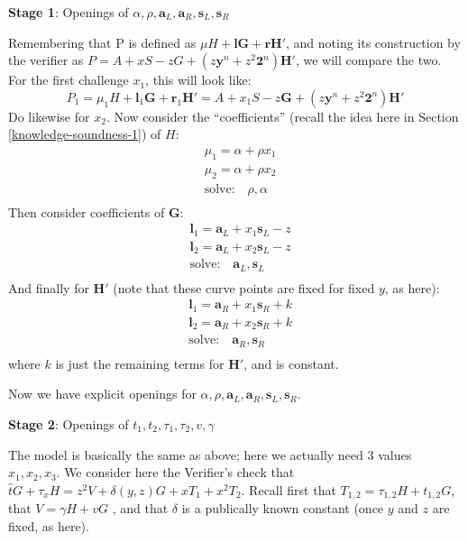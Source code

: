 \documentclass[10pt,a4paper]{article}
\begin{document}
\textbf{Stage 1}: Openings of $\alpha, \rho, \textbf{a}_L, \textbf{a}_R, \textbf{s}_L, \textbf{s}_R$

Remembering that P is defined as $\mu H + \textbf{lG} + \textbf{rH}'$, and noting its construction by the
verifier as $P = A + xS -zG + \left(z\textbf{y}^n + z^2\textbf{2}^n\right)\textbf{H}'$, we will compare the two. For the first challenge $x_1$, this
will look like:
\[P_1 = \mu_1 H + \textbf{l}_1\textbf{G} + \textbf{r}_1\textbf{H}' = A + x_1S -z\textbf{G} + (z\textbf{y}^n+z^2\textbf{2}^n)\textbf{H}'\]
Do likewise for $x_2$. Now consider the ``coefficients'' (recall the idea
here in Section \ref{knowledge-soundness-1}) of $H$:
\begin{align*}
& \mu_1 = \alpha + \rho x_1 \\
& \mu_2 = \alpha + \rho x_2 \\
& \textrm{solve:}\quad \rho, \alpha \\
\end{align*}
Then consider coefficients of $\mathbf{G}$:
\begin{align*}
& \textbf{l}_1 = \textbf{a}_L + x_1\textbf{s}_L - z \\
& \textbf{l}_2 = \textbf{a}_L + x_2\textbf{s}_L - z \\
&\textrm{solve:}\quad \textbf{a}_L, \textbf{s}_L \\
\end{align*}
And finally for $\mathbf{H}'$ (note that these curve points are fixed for fixed $y$, as
here):
\begin{align*}
& \textbf{l}_1 = \textbf{a}_R + x_1\textbf{s}_R +k \\
& \textbf{l}_2 = \textbf{a}_R + x_2\textbf{s}_R +k \\
&\textrm{solve:}\quad \textbf{a}_R, \textbf{s}_R \\
\end{align*}
where $k$ is just the remaining terms for $\mathbf{H}'$, and is constant.

Now we have explicit openings for $\alpha, \rho, \textbf{a}_L, \textbf{a}_R, \textbf{s}_L, \textbf{s}_R$.

\textbf{Stage 2}: Openings of $t_1, t_2, \tau_1, \tau_2, v, \gamma$

The model is basically the same as above; here we actually need 3 values $x_1, x_2, x_3$. We consider here the Verifier's check that $\hat{t} G + \tau_x H = z^2V + \delta(y, z)G + xT_1 + x^2T_2$. Recall first that $T_{1,2} =\tau_{1,2} H + t_{1,2} G$, that $V = \gamma H + v G$
, and that $\delta$ is a publically known constant (once $y$ and $z$ are fixed, as here).
\end{document}
